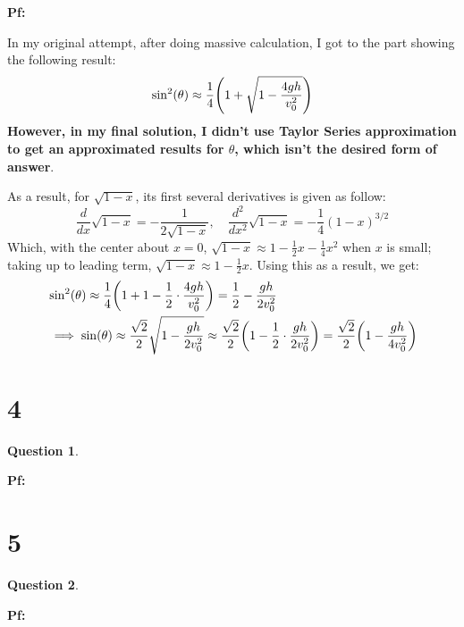 \documentclass{article}
\newtheorem{question}{Question}
\DeclarePairedDelimiter{\paran}{(}{)}%
\begin{document}
\textbf{Pf:}

In my original attempt, after doing massive calculation, I got to the part showing the following result:
\begin{equation}
    \sin^2(\theta)\approx \frac{1}{4}\paran*{1+\sqrt{1-\frac{4gh}{v_0^2}}}
\end{equation}
\textbf{However, in my final solution, I didn't use Taylor Series approximation to get an approximated results for $\theta$, which isn't the desired form of answer}.

As a result, for $\sqrt{1-x}$, its first several derivatives is given as follow:
\begin{equation}
    \frac{d}{dx}\sqrt{1-x}=-\frac{1}{2\sqrt{1-x}},\quad\frac{d^2}{dx^2}\sqrt{1-x} = -\frac{1}{4}(1-x)^{3/2}
\end{equation}
Which, with the center about $x=0$, $\sqrt{1-x}\approx 1-\frac{1}{2}x-\frac{1}{4}x^2$ when $x$ is small; taking up to leading term, $\sqrt{1-x}\approx 1-\frac{1}{2}x$. Using this as a result, we get:
\begin{align}
    &\sin^2(\theta)\approx \frac{1}{4}\paran*{1+1-\frac{1}{2}\cdot \frac{4gh}{v_0^2}} = \frac{1}{2}-\frac{gh}{2v_0^2}\\
    &\implies \sin(\theta)\approx \frac{\sqrt{2}}{2}\sqrt{1-\frac{gh}{2v_0^2}}\approx \frac{\sqrt{2}}{2}\paran*{1-\frac{1}{2}\cdot\frac{gh}{2v_0^2}} = \frac{\sqrt{2}}{2}\paran*{1-\frac{gh}{4v_0^2}}
\end{align}


\break

\section*{4}
\begin{question}\label{q4}
    
\end{question}

\textbf{Pf:}

\break

\section*{5}
\begin{question}\label{q5}
    
\end{question}

\textbf{Pf:}

\break
\end{document}
